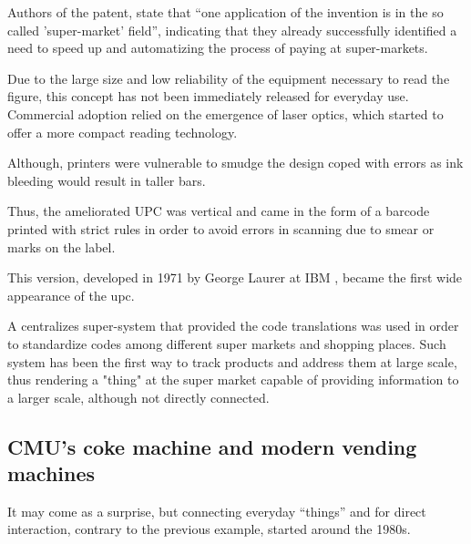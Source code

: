 			Authors of the patent, state  that ``one application of the invention is in the so called 'super-market' field'', indicating that they already successfully identified a need to speed up and automatizing the process of paying at super-markets.
			
			Due to the large size and low reliability of the equipment necessary to read the figure, this concept has not been immediately released for everyday use.
			Commercial adoption relied on the emergence of laser optics, which started to offer a more compact reading technology.
			
			Although, printers were vulnerable to smudge the design coped with errors as ink bleeding would result in taller bars.
			
			Thus, the ameliorated UPC was vertical and came in the form of a barcode printed with strict rules in order to avoid errors in scanning due to smear or marks on the label.
			
			This version, developed in 1971 by George Laurer at IBM \cite{upc_ibm}, became the first wide appearance of the upc.
			
			A centralizes super-system that provided the code translations was used in order to standardize codes among different super markets and shopping places.
			Such system has been the first way to track products and address them at large scale, thus rendering a "thing" at the super market capable of providing information to a larger scale, although not directly connected.
			
		\subsection{CMU's coke machine and modern vending machines}
	
		
			It may come as a surprise, but connecting everyday ``things'' and for direct interaction, contrary to the previous example, started around the 1980s.
			
